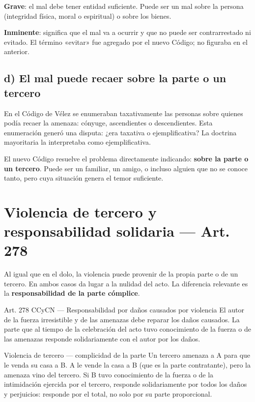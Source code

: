 \documentclass[12pt,oneside]{book}
\begin{document}
\textbf{Grave}: el mal debe tener entidad suficiente. Puede ser un mal sobre la persona (integridad física, moral o espiritual) o sobre los bienes.

\textbf{Inminente}: significa que el mal va a ocurrir y que no puede ser contrarrestado ni evitado. El término «evitar» fue agregado por el nuevo Código; no figuraba en el anterior.

\subsection*{d) El mal puede recaer sobre la parte o un tercero}

En el Código de Vélez se enumeraban taxativamente las personas sobre quienes podía recaer la amenaza: cónyuge, ascendientes o descendientes. Esta enumeración generó una disputa: ¿era taxativa o ejemplificativa? La doctrina mayoritaria la interpretaba como ejemplificativa.

El nuevo Código resuelve el problema directamente indicando: \textbf{sobre la parte o un tercero}. Puede ser un familiar, un amigo, o incluso alguien que no se conoce tanto, pero cuya situación genera el temor suficiente.

\section{Violencia de tercero y responsabilidad solidaria --- Art. 278}

Al igual que en el dolo, la violencia puede provenir de la propia parte o de un tercero. En ambos casos da lugar a la nulidad del acto. La diferencia relevante es la \textbf{responsabilidad de la parte cómplice}.

\begin{articulo}{Art. 278 CCyCN --- Responsabilidad por daños causados por violencia}
El autor de la fuerza irresistible y de las amenazas debe reparar los daños causados. La parte que al tiempo de la celebración del acto tuvo conocimiento de la fuerza o de las amenazas responde solidariamente con el autor por los daños.
\end{articulo}

\begin{example}{Violencia de tercero --- complicidad de la parte}
Un tercero amenaza a A para que le venda su casa a B. A le vende la casa a B (que es la parte contratante), pero la amenaza vino del tercero. Si B tuvo conocimiento de la fuerza o de la intimidación ejercida por el tercero, responde solidariamente por todos los daños y perjuicios: responde por el total, no solo por su parte proporcional.
\end{example}
\end{document}
